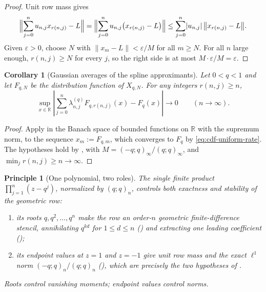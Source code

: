 \documentclass[11pt,oneside,openany]{book}
\newtheorem{corollary}[corollary]{Corollary}
\newtheorem{principle}[principle]{Principle}
\theoremstyle{definition}
\theoremstyle{remark}
\newcommand{\R}{\mathbb R}
\newcommand{\abs}[1]{\lvert #1\rvert}
\newcommand{\norm}[1]{\lVert #1\rVert}
\begin{document}
\begin{proof}
Unit row mass gives
\[
 \Bigl\|\sum_{j=0}^{n}u_{n,j}x_{r(n,j)}-L\Bigr\|
 =\Bigl\|\sum_{j=0}^{n}u_{n,j}\bigl(x_{r(n,j)}-L\bigr)\Bigr\|
 \le\sum_{j=0}^{n}\abs{u_{n,j}}\,\bigl\|x_{r(n,j)}-L\bigr\| .
\]
Given $\varepsilon>0$, choose $N$ with $\norm{x_m-L}<\varepsilon/M$ for all $m\ge N$.
For all $n$ large enough, $r(n,j)\ge N$ for every $j$, so the right side is at most
$M\cdot\varepsilon/M=\varepsilon$.
\end{proof}

\begin{corollary}[Gaussian averages of the spline approximants]\label{cor:gaussian-row-spline-average}
Let $0<q<1$ and let $F_{q,N}$ be the distribution function of $X_{q,N}$.  For any
integers $r(n,j)\ge n$,
\[
 \sup_{x\in\R}\left|\sum_{j=0}^{n}\lambda_{n,j}^{(q)}F_{q,r(n,j)}(x)-F_q(x)\right|
 \longrightarrow0
 \qquad(n\to\infty).
\]
\end{corollary}

\begin{proof}
Apply  in the Banach space of bounded functions on $\R$ with
the supremum norm, to the sequence $x_m:=F_{q,m}$, which converges to $F_q$ by
\eqref{eq:cdf-uniform-rate}.  The hypotheses hold by
, with $M=(-q;q)_\infty/(q;q)_\infty$, and
$\min_jr(n,j)\ge n\to\infty$.
\end{proof}

\begin{principle}[One polynomial, two roles]\label{prin:row-exactness-stability}
The single finite product $\prod_{j=1}^{n}(z-q^j)$, normalized by $(q;q)_n$, controls
both exactness and stability of the geometric row:
\begin{enumerate}
\item its \emph{roots} $q,q^2,\ldots,q^n$ make the row an order-$n$ geometric
finite-difference stencil, annihilating $q^{kd}$ for $1\le d\le n$
() and extracting one leading coefficient
();
\item its \emph{endpoint values} at $z=1$ and $z=-1$ give unit row mass and the exact
$\ell^1$ norm $(-q;q)_n/(q;q)_n$ (), which are
precisely the two hypotheses of .
\end{enumerate}
Roots control vanishing moments; endpoint values control norms.
\end{principle}
\end{document}
